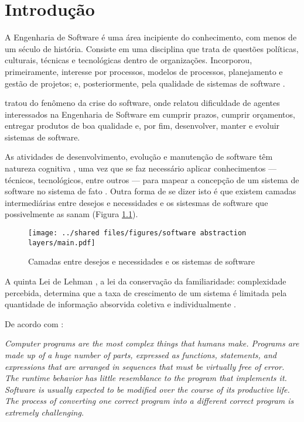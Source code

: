 
%

\chapter{Introdução}
\label{chap:Introdução}

A Engenharia de Software é uma área incipiente do conhecimento, com menos
de um século de história. Consiste em uma disciplina que trata de questões
políticas, culturais, técnicas e tecnológicas dentro de organizações.
Incorporou, primeiramente, interesse por processos, modelos de processos,
planejamento e gestão de projetos; e, posteriormente, pela qualidade de
sistemas de software \cite{Wazlawick2013:Engenharia}.

 tratou do fenômeno da crise do
software, onde relatou dificuldade de agentes interessados na Engenharia de
Software em cumprir prazos, cumprir orçamentos, entregar produtos de boa
qualidade e, por fim, desenvolver, manter e evoluir sistemas de software.

As atividades de desenvolvimento, evolução e manutenção de software têm natureza
cognitiva \cite{Letovsky1987:Cognitive}, uma vez que se faz necessário aplicar
conhecimentos --- técnicos, tecnológicos, entre outros --- para mapear a
concepção de um sistema de software no sistema de fato
\cite{Brooks1983:TheoryComprehension}. Outra forma de se dizer isto é que 
existem camadas intermediárias entre desejos e necessidades e os sistesmas
de software que possivelmente as sanam (Figura \ref{fig:CamadasAbstraçãoSoftware}).

\begin{figure}[!htb]
    \centering
    \caption{Camadas entre desejos e necessidades e os sistemas de software}
    \texttt{[image: ../shared files/figures/software abstraction layers/main.pdf]}
    \label{fig:CamadasAbstraçãoSoftware}
\end{figure}

A quinta Lei de Lehman \cite{Lehman1980:Laws}, a lei da conservação da
familiaridade: complexidade percebida, determina que a taxa de crescimento de
um sistema é limitada pela quantidade de informação absorvida coletiva e
individualmente \cite{Wazlawick2013:Engenharia}.

De acordo com :

\begin{citacao}
\textit{Computer programs are the most complex things that humans make. Programs
are made up of a huge number of parts, expressed as functions, statements, and
expressions that are arranged in sequences that must be virtually free of error.
The runtime behavior has little resemblance to the program that implements it.
Software is usually expected to be modified over the course of its productive
life. The process of converting one correct program into a different correct
program is extremely challenging.}
\end{citacao}

